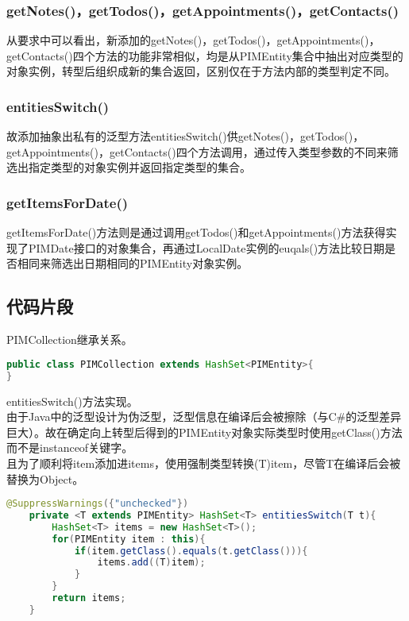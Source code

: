 \documentclass[a4paper]{article}
\begin{document}
    \subsubsection{getNotes()，getTodos()，getAppointments()，getContacts()}
    从要求中可以看出，新添加的getNotes()，getTodos()，getAppointments()，getContacts()四个方法的功能非常相似，均是从PIMEntity集合中抽出对应类型的对象实例，转型后组织成新的集合返回，区别仅在于方法内部的类型判定不同。\\

    \subsubsection{entitiesSwitch()}
    故添加抽象出私有的泛型方法entitiesSwitch()供getNotes()，getTodos()，getAppointments()，getContacts()四个方法调用，通过传入类型参数的不同来筛选出指定类型的对象实例并返回指定类型的集合。\\

    \subsubsection{getItemsForDate()}
    getItemsForDate()方法则是通过调用getTodos()和getAppointments()方法获得实现了PIMDate接口的对象集合，再通过LocalDate实例的euqals()方法比较日期是否相同来筛选出日期相同的PIMEntity对象实例。\\

\subsection{代码片段}

PIMCollection继承关系。

\begin{lstlisting}[language=Java]
public class PIMCollection extends HashSet<PIMEntity>{
}
\end{lstlisting}

entitiesSwitch()方法实现。\\
由于Java中的泛型设计为伪泛型，泛型信息在编译后会被擦除（与C\#的泛型差异巨大）。故在确定向上转型后得到的PIMEntity对象实际类型时使用getClass()方法而不是instanceof关键字。\\
且为了顺利将item添加进items，使用强制类型转换(T)item，尽管T在编译后会被替换为Object。\\

\begin{lstlisting}[language=Java]
    @SuppressWarnings({"unchecked"})
    private <T extends PIMEntity> HashSet<T> entitiesSwitch(T t){
        HashSet<T> items = new HashSet<T>();
        for(PIMEntity item : this){
            if(item.getClass().equals(t.getClass())){
                items.add((T)item);
            }
        }
        return items;
    }
\end{lstlisting}
\end{document}
